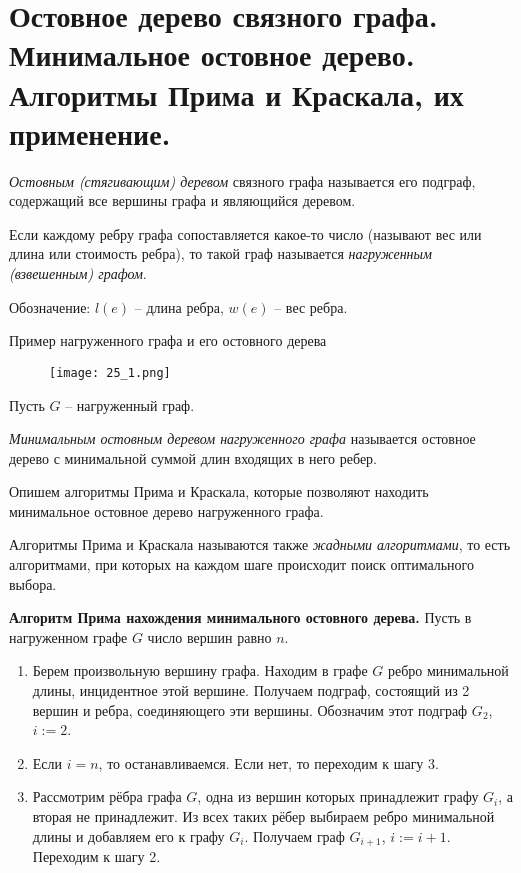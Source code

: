 \section{Остовное дерево связного графа. Минимальное остовное дерево. Алгоритмы Прима и Краскала, 
их применение.}

\begin{definition}
    \textit{Остовным (стягивающим) деревом} связного графа называется
    его подграф, содержащий все вершины графа и являющийся деревом.
\end{definition}

\begin{definition}
    Если каждому ребру графа сопоставляется какое-то число
    (называют вес или длина или стоимость ребра), то такой граф называется
    \textit{нагруженным (взвешенным) графом}.
\end{definition}

Обозначение: $l(e)$ -- длина ребра, $w(e)$ -- вес ребра.

Пример нагруженного графа и его остовного дерева
\begin{figure}[h]
    \centering
    \texttt{[image: 25\_1.png]}
\end{figure}

Пусть $G$ -- нагруженный граф.

\begin{definition}
    \textit{Минимальным остовным деревом нагруженного графа}
    называется остовное дерево с минимальной суммой длин входящих в него
    ребер.
\end{definition}

Опишем алгоритмы Прима и Краскала, которые позволяют находить
минимальное остовное дерево нагруженного графа.

Алгоритмы Прима и Краскала называются также \textit{жадными алгоритмами}, то
есть алгоритмами, при которых на каждом шаге происходит поиск
оптимального выбора.

\textbf{Алгоритм Прима нахождения минимального остовного дерева.}
Пусть в нагруженном графе $G$ число вершин равно $n$.
\begin{enumerate}[left=0.0em, labelsep=1em, topsep=0.0em, itemsep=0pt, parsep=0.5em]
    \item Берем произвольную вершину графа. Находим в графе $G$ ребро
    минимальной длины, инцидентное этой вершине. Получаем подграф,
    состоящий из 2 вершин и ребра, соединяющего эти вершины. Обозначим этот
    подграф $G_2$, $i:=2$.
    \item Если $i=n$, то останавливаемся. Если нет, то переходим к шагу 3.
    \item Рассмотрим рёбра графа $G$, одна из вершин которых принадлежит
    графу $G_i$, а вторая не принадлежит. Из всех таких рёбер выбираем ребро
    минимальной длины и добавляем его к графу $G_i$. Получаем граф $G_{i+1}$, $i:=i+1$.
    Переходим к шагу 2.
\end{enumerate}

